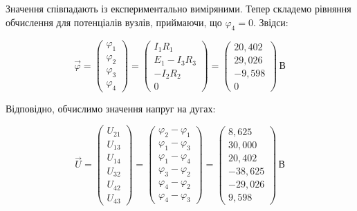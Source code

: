 \documentclass[12pt,a4paper]{article}
\begin{document}
    Значення співпадають із експериментально виміряними. Тепер складемо рівняння обчислення для потенціалів вузлів, приймаючи, що
    $\varphi_{4}=0$. Звідси: 

    \[
    \vec{\varphi} = 
    \begin{pmatrix}
    \varphi_1\\
    \varphi_2\\
    \varphi_3\\
    \varphi_4
    \end{pmatrix}
    =
    \begin{pmatrix}
    I_1 R_1\\
    E_1 - I_3 R_3\\
    - I_2 R_2\\
    0
    \end{pmatrix}
    =
    \begin{pmatrix}
    20{,}402\\
    29{,}026\\
    -9{,}598\\
    0
    \end{pmatrix}\,\text{В}
    \]

    Відповідно, обчислимо значення напруг на дугах:

    \[
    \vec{U} =
    \begin{pmatrix}
    U_{21}\\
    U_{13}\\
    U_{14}\\
    U_{32}\\
    U_{42}\\
    U_{43}
    \end{pmatrix}
    =
    \begin{pmatrix}
    \varphi_2-\varphi_1\\
    \varphi_1-\varphi_3\\
    \varphi_1-\varphi_4\\
    \varphi_3-\varphi_2\\
    \varphi_4-\varphi_2\\
    \varphi_4-\varphi_3
    \end{pmatrix}
    =
    \begin{pmatrix}
    8{,}625\\
    30{,}000\\
    20{,}402\\
    -38{,}625\\
    -29{,}026\\
    9{,}598
    \end{pmatrix}\,\text{В}
    \]
\end{document}
